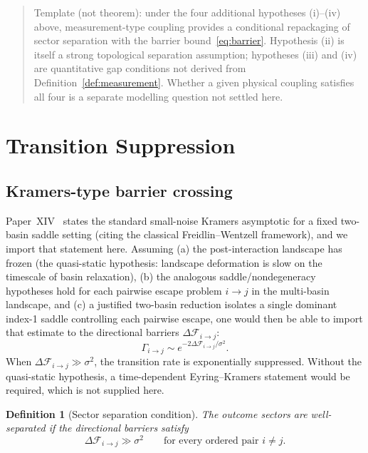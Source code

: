 \documentclass[12pt]{article}
\newtheorem{definition}[theorem]{Definition}
\newcommand{\Fcal}{\mathcal{F}}
\begin{document}
\begin{quote}
Template (not theorem): under the four additional hypotheses (i)--(iv) above, measurement-type coupling provides a conditional repackaging of sector separation with the barrier bound~\eqref{eq:barrier}. Hypothesis (ii) is itself a strong topological separation assumption; hypotheses (iii) and (iv) are quantitative gap conditions not derived from Definition~\ref{def:measurement}. Whether a given physical coupling satisfies all four is a separate modelling question not settled here.
\end{quote}

\section{Transition Suppression}\label{sec:suppression}

\subsection{Kramers-type barrier crossing}

Paper~XIV~\citep{SmartXIV} states the standard small-noise Kramers asymptotic for a fixed two-basin saddle setting (citing the classical Freidlin--Wentzell framework), and we import that statement here. Assuming (a) the post-interaction landscape has frozen (the quasi-static hypothesis: landscape deformation is slow on the timescale of basin relaxation), (b) the analogous saddle/nondegeneracy hypotheses hold for each pairwise escape problem $i \to j$ in the multi-basin landscape, and (c) a justified two-basin reduction isolates a single dominant index-1 saddle controlling each pairwise escape, one would then be able to import that estimate to the directional barriers $\Delta\Fcal_{i\to j}$:
\begin{equation}\label{eq:kramers}
    \Gamma_{i \to j} \sim e^{-2\Delta\Fcal_{i \to j}/\sigma^2}.
\end{equation}
When $\Delta\Fcal_{i \to j} \gg \sigma^2$, the transition rate is exponentially suppressed. Without the quasi-static hypothesis, a time-dependent Eyring--Kramers statement would be required, which is not supplied here.

\begin{definition}[Sector separation condition]\label{def:separation}
The outcome sectors are \textit{well-separated} if the directional barriers satisfy
\begin{equation}\label{eq:separation}
    \Delta\Fcal_{i\to j} \gg \sigma^2 \qquad \text{for every ordered pair } i \neq j.
\end{equation}
\end{definition}
\end{document}
